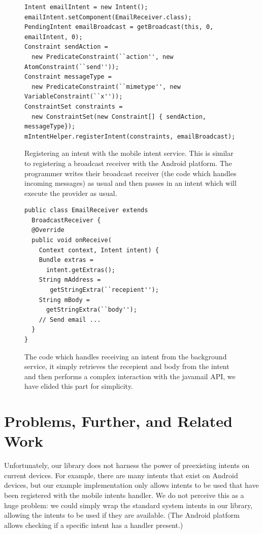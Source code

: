 \documentclass{acm_proc_article-sp}
\begin{document}
\begin{figure}
\begin{lstlisting}
Intent emailIntent = new Intent();
emailIntent.setComponent(EmailReceiver.class);
PendingIntent emailBroadcast = getBroadcast(this, 0, emailIntent, 0);
Constraint sendAction = 
  new PredicateConstraint(``action'', new AtomConstraint(``send''));
Constraint messageType = 
  new PredicateConstraint(``mimetype'', new VariableConstraint(``x''));
ConstraintSet constraints = 
  new ConstraintSet(new Constraint[] { sendAction, messageType});
mIntentHelper.registerIntent(constraints, emailBroadcast);
\end{lstlisting}
\caption{Registering an intent with the mobile intent service.  This
  is similar to registering a broadcast receiver with the Android
  platform.  The programmer writes their broadcast receiver (the code
  which handles incoming messages) as usual and then passes in an
  intent which will execute the provider as usual.}
\label{fig:registration-code}
\end{figure}

\begin{figure}
  \begin{lstlisting}
public class EmailReceiver extends
  BroadcastReceiver {
  @Override
  public void onReceive(
    Context context, Intent intent) {
    Bundle extras = 
      intent.getExtras();
    String mAddress =
       getStringExtra(``recepient'');
    String mBody = 
      getStringExtra(``body'');
    // Send email ...
  }
} 
\end{lstlisting}
\caption{The code which handles receiving an intent from the
  background service, it simply retrieves the recepient and body from
  the intent and then performs a complex interaction with the javamail
  API, we have elided this part for simplicity.}
  \label{fig:email-receiver}
\end{figure}

\section{Problems, Further, and Related Work}

Unfortunately, our library does not harness the power of preexisting
intents on current devices.  For example, there are many intents that
exist on Android devices, but our example implementation only allows
intents to be used that have been registered with the mobile intents
handler.  We do not perceive this as a huge problem: we could simply
wrap the standard system intents in our library, allowing the intents
to be used if they are available.  (The Android platform allows
checking if a specific intent has a handler present.)
\end{document}
